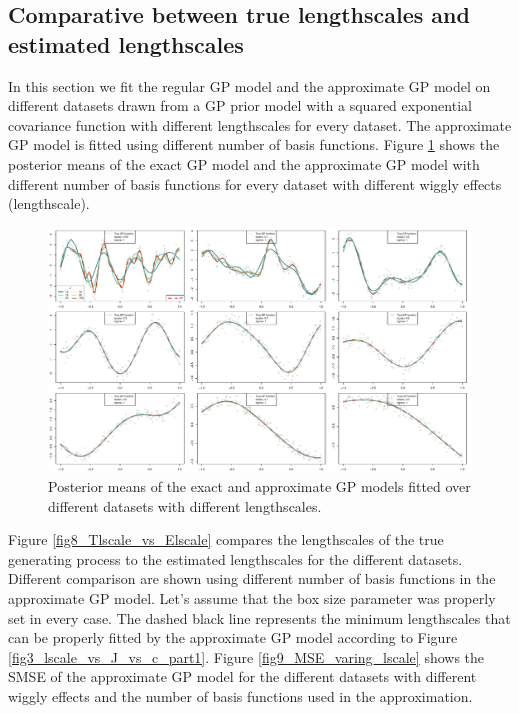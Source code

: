 \documentclass[]{interact}
\theoremstyle{plain}%
\theoremstyle{definition}
\theoremstyle{remark}
\begin{document}
\subsection{Comparative between true lengthscales and estimated lengthscales}

In this section we fit the regular GP model and the approximate GP model on different datasets drawn from a GP prior model with a squared exponential covariance function with different lengthscales for every dataset. The approximate GP model is fitted using different number of basis functions. Figure \ref{fig7_varing_lscale} shows the posterior means of the exact GP model and the approximate GP model with different number of basis functions for every dataset with different wiggly effects (lengthscale).

\begin{figure}[H]
\centering
\includegraphics[scale=0.4]{fig7_varing_lscale.pdf}
\caption{Posterior means of the exact and approximate GP models fitted over different datasets with different lengthscales.}
  \label{fig7_varing_lscale}
\end{figure}

Figure \ref{fig8_Tlscale_vs_Elscale} compares the lengthscales of the true generating process to the estimated lengthscales for the different datasets. Different comparison are shown using different number of basis functions in the approximate GP model. Let's assume that the box size parameter was properly set in every case. The dashed black line represents the minimum lengthscales that can be properly fitted by the approximate GP model according to Figure \ref{fig3_lscale_vs_J_vs_c_part1}. Figure \ref{fig9_MSE_varing_lscale} shows the SMSE of the approximate GP model for the different datasets with different wiggly effects and the number of basis functions used in the approximation.
\end{document}
